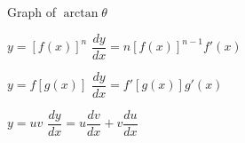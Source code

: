 \documentclass[grid,avery5371]{flashcards}
\begin{document}
\begin{flashcard}[]{\Huge{Graph of $\arctan\theta$}}
\end{flashcard}

\begin{flashcard}[]{\Huge{$y=[f(x)]^n$}}
\Huge{$\dfrac{dy}{dx}=n[f(x)]^{n-1}f'(x)$}
\end{flashcard}

\begin{flashcard}[]{\Huge{$y=f[g(x)]$}}
\Huge{$\dfrac{dy}{dx}=f'[g(x)]g'(x)$}
\end{flashcard}

\begin{flashcard}[]{\Huge{$y=uv$}}
\Huge{$\dfrac{dy}{dx}=u\dfrac{dv}{dx}+v\dfrac{du}{dx}$}
\end{flashcard}
\end{document}
